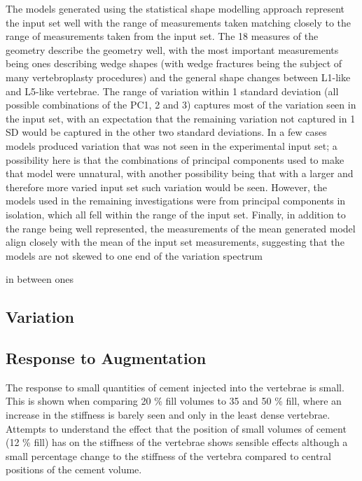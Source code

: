 The models generated using the statistical shape modelling approach represent
the input set well with the range of measurements taken matching closely to the
range of measurements taken from the input set. The 18 measures of the geometry
describe the geometry well, with the most important measurements being ones
describing wedge shapes (with wedge fractures being the subject of many
vertebroplasty procedures) and the general shape changes between L1-like and
L5-like vertebrae. The range of variation within 1 standard deviation (all
possible combinations of the PC1, 2 and 3) captures most of the variation seen
in the input set, with an expectation that the remaining variation not captured
in 1 SD would be captured in the other two standard deviations. In a few cases
models produced variation that was not seen in the experimental input set; a
possibility here is that the combinations of principal components used to make
that model were unnatural, with another possibility being that with a larger
and therefore more varied input set such variation would be seen. However, the
models used in the remaining investigations were from principal components in
isolation, which all fell within the range of the input set. Finally, in
addition to the range being well represented, the measurements of the mean
generated model align closely with the mean of the input set measurements,
suggesting that the models are not skewed to one end of the variation
spectrum



in between ones

\subsection{Variation}

\subsection{Response to Augmentation}

The response to small quantities of cement injected into the vertebrae is
small. This is shown when comparing 20 \% fill volumes to 35 and 50 \% fill,
where an increase in the stiffness is barely seen and only in the least dense
vertebrae.  Attempts to understand the effect that the position of small
volumes of cement (12 \% fill) has on the stiffness of the vertebrae shows
sensible effects although a small percentage change to the stiffness of the
vertebra compared to central positions of the cement volume.



